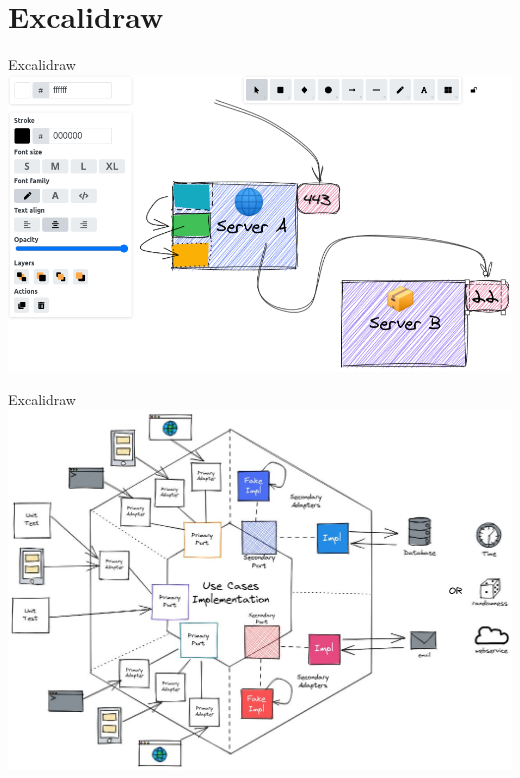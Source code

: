 \documentclass[10pt, xcolor=dvipsnames]{beamer}
\begin{document}
	\section{Excalidraw}
	
	\begin{frame}{Excalidraw}
		\centering
		\includegraphics[width=1\linewidth]{../latex-image/excalidraw1}
	\end{frame}
	
	\begin{frame}{Excalidraw}
		\centering
		\includegraphics[width=1\linewidth]{../latex-image/excalidraw2}
	\end{frame}
	
\end{document}
